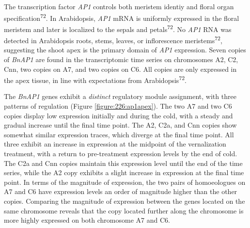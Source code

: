 \documentclass[12pt,]{book}
\begin{document}
The transcription factor \emph{AP1} controls both meristem identiy and
floral organ specification\textsuperscript{72}. In Arabidopsis,
\emph{AP1} mRNA is uniformly expressed in the floral meristem and later
is localized to the sepals and petals\textsuperscript{72}. No \emph{AP1}
RNA was detected in Arabidopsis roots, stems, leaves, or inflorescence
meristems\textsuperscript{72}, suggesting the shoot apex is the primary
domain of \emph{AP1} expression. Seven copies of \emph{BnAP1} are found
in the transcriptomic time series on chromosomes A2, C2, Cnn, two copies
on A7, and two copies on C6. All copies are only expressed in the apex
tissue, in line with expectations from Arabidopsis\textsuperscript{72}.

The \emph{BnAP1} genes exhibit a \emph{distinct} regulatory module
assignment, with three patterns of regulation (Figure
\ref{figure:226:ap1apex}). The two A7 and two C6 copies display low
expression initially and during the cold, with a steady and gradual
increase until the final time point. The A2, C2a, and Cnn copies show
somewhat similar expression traces, which diverge at the final time
point. All three exhibit an increase in expression at the midpoint of
the vernalization treatment, with a return to pre-treatment expression
levels by the end of cold. The C2a and Cnn copies maintain this
expression level until the end of the time series, while the A2 copy
exhibits a slight increase in expression at the final time point. In
terms of the magnitude of expression, the two pairs of homoeologues on
A7 and C6 have expression levels an order of magnitude higher than the
other copies. Comparing the magnitude of expression between the genes
located on the same chromosome reveals that the copy located further
along the chromosome is more highly expressed on both chromosome A7 and
C6.
\end{document}
